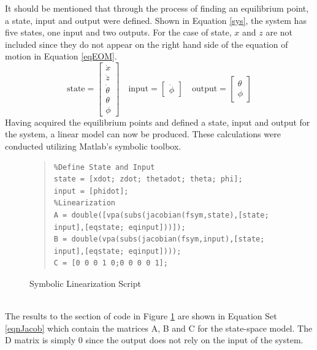 \documentclass[12pt]{article}
\begin{document}
It should be mentioned that through the process of finding an equilibrium point, a state, input and output were defined. Shown in Equation \eqref{sys}, the system has five states, one input and two outputs. For the case of state, $x$ and $z$ are not included since they do not appear on the right hand side of the equation of motion in Equation \eqref{eqEOM}.
\begin{equation}
\label{sys}
\textrm{state} = 
\begin{bmatrix}
\dot{x} \\ \dot{z} \\ \dot{\theta} \\  \theta \\ \phi
\end{bmatrix}
\quad
\textrm{input} = 
\begin{bmatrix}
\dot{\phi}
\end{bmatrix}
\quad
\textrm{output} = 
\begin{bmatrix}
\theta \\ \phi
\end{bmatrix}
\end{equation}
Having acquired the equilibrium points and defined a state, input and output for the system, a linear model can now be produced.  These calculations were conducted utilizing Matlab's symbolic toolbox. 
\\
\begin{figure}[!h]
\begin{quote}
\begin{lstlisting}
%Define State and Input
state = [xdot; zdot; thetadot; theta; phi];
input = [phidot];
%Linearization
A = double([vpa(subs(jacobian(fsym,state),[state; input],[eqstate; eqinput]))]);
B = double(vpa(subs(jacobian(fsym,input),[state; input],[eqstate; eqinput])));
C = [0 0 0 1 0;0 0 0 0 1];
\end{lstlisting}
\end{quote}
\caption{Symbolic Linearization Script\label{fig:linear}}
\end{figure} 
\\
The results to the section of code in Figure \ref{fig:linear} are shown in Equation Set \eqref{eqnJacob} which contain the matrices A, B and C for the state-space model. The D matrix is simply 0 since the output does not rely on the input of the system.
\\
\end{document}
